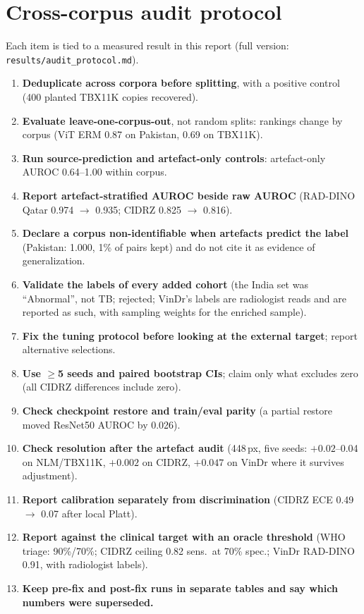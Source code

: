 \documentclass[10pt,a4paper]{article}
\begin{document}
\section{Cross-corpus audit protocol}\label{app:audit}
Each item is tied to a measured result in this report (full version: \texttt{results/audit\_protocol.md}).
\begin{enumerate}[leftmargin=*]
\item \textbf{Deduplicate across corpora before splitting}, with a positive control (400 planted TBX11K copies recovered).
\item \textbf{Evaluate leave-one-corpus-out}, not random splits: rankings change by corpus (ViT ERM 0.87 on Pakistan, 0.69 on TBX11K).
\item \textbf{Run source-prediction and artefact-only controls}: artefact-only AUROC 0.64--1.00 within corpus.
\item \textbf{Report artefact-stratified AUROC beside raw AUROC} (RAD-DINO Qatar 0.974 $\rightarrow$ 0.935; CIDRZ 0.825 $\rightarrow$ 0.816).
\item \textbf{Declare a corpus non-identifiable when artefacts predict the label} (Pakistan: 1.000, 1\% of pairs kept) and do not cite it as evidence of generalization.
\item \textbf{Validate the labels of every added cohort} (the India set was ``Abnormal'', not TB; rejected; VinDr's labels are radiologist reads and are reported as such, with sampling weights for the enriched sample).
\item \textbf{Fix the tuning protocol before looking at the external target}; report alternative selections.
\item \textbf{Use $\ge$5 seeds and paired bootstrap CIs}; claim only what excludes zero (all CIDRZ differences include zero).
\item \textbf{Check checkpoint restore and train/eval parity} (a partial restore moved ResNet50 AUROC by 0.026).
\item \textbf{Check resolution after the artefact audit} (448\,px, five seeds: $+0.02$--0.04 on NLM/TBX11K, $+0.002$ on CIDRZ, $+0.047$ on VinDr where it survives adjustment).
\item \textbf{Report calibration separately from discrimination} (CIDRZ ECE 0.49 $\rightarrow$ 0.07 after local Platt).
\item \textbf{Report against the clinical target with an oracle threshold} (WHO triage: 90\%/70\%; CIDRZ ceiling 0.82 sens.\ at 70\% spec.; VinDr RAD-DINO 0.91, with radiologist labels).
\item \textbf{Keep pre-fix and post-fix runs in separate tables and say which numbers were superseded.}
\end{enumerate}
\end{document}
